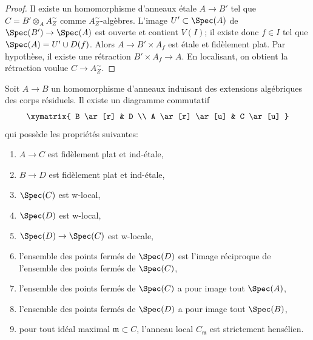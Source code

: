 \begin{proof}
Il existe un homomorphisme d'anneaux \'etale $A \to B'$ tel que
$C = B' \otimes_A A_Z^\sim$ comme $A_Z^\sim$-algèbres.
L'image $U' \subset \Spec(A)$ de $\Spec(B') \to \Spec(A)$
est ouverte et contient $V(I)$; il existe donc $f \in I$ tel
que $\Spec(A) = U' \cup D(f)$. Alors $A \to B' \times A_f$
est \'etale et fidèlement plat. Par hypothèse, il existe une rétraction
$B' \times A_f \to A$. En localisant, on obtient la rétraction voulue
$C \to A_Z^\sim$.
\end{proof}

\begin{lemma}
\label{lemma-get-w-local-algebraic-residue-field-extensions}
Soit $A \to B$ un homomorphisme d'anneaux induisant des extensions algébriques des corps résiduels.
Il existe un diagramme commutatif
$$
\xymatrix{
B \ar[r] & D \\
A \ar[r] \ar[u] & C \ar[u]
}
$$
qui possède les propriétés suivantes:
\begin{enumerate}
\item $A \to C$ est fidèlement plat et ind-\'etale,
\item $B \to D$ est fidèlement plat et ind-\'etale,
\item $\Spec(C)$ est w-local,
\item $\Spec(D)$ est w-local,
\item $\Spec(D) \to \Spec(C)$ est w-locale,
\item l'ensemble des points fermés de $\Spec(D)$ est l'image réciproque
de l'ensemble des points fermés de $\Spec(C)$,
\item l'ensemble des points fermés de $\Spec(C)$ a pour image tout $\Spec(A)$,
\item l'ensemble des points fermés de $\Spec(D)$ a pour image tout $\Spec(B)$,
\item pour tout idéal maximal $\mathfrak m \subset C$, l'anneau local
$C_\mathfrak m$ est strictement hensélien.
\end{enumerate}
\end{lemma}

